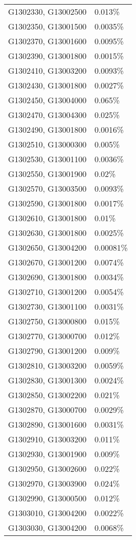 \begin{longtable}[]{@{}ll@{}}
G1302330, G13002500 & 0.013\% \\
G1302350, G13001500 & 0.0035\% \\
G1302370, G13001600 & 0.0095\% \\
G1302390, G13001800 & 0.0015\% \\
G1302410, G13003200 & 0.0093\% \\
G1302430, G13001800 & 0.0027\% \\
G1302450, G13004000 & 0.065\% \\
G1302470, G13004300 & 0.025\% \\
G1302490, G13001800 & 0.0016\% \\
G1302510, G13000300 & 0.005\% \\
G1302530, G13001100 & 0.0036\% \\
G1302550, G13001900 & 0.02\% \\
G1302570, G13003500 & 0.0093\% \\
G1302590, G13001800 & 0.0017\% \\
G1302610, G13001800 & 0.01\% \\
G1302630, G13001800 & 0.0025\% \\
G1302650, G13004200 & 0.00081\% \\
G1302670, G13001200 & 0.0074\% \\
G1302690, G13001800 & 0.0034\% \\
G1302710, G13001200 & 0.0054\% \\
G1302730, G13001100 & 0.0031\% \\
G1302750, G13000800 & 0.015\% \\
G1302770, G13000700 & 0.012\% \\
G1302790, G13001200 & 0.009\% \\
G1302810, G13003200 & 0.0059\% \\
G1302830, G13001300 & 0.0024\% \\
G1302850, G13002200 & 0.021\% \\
G1302870, G13000700 & 0.0029\% \\
G1302890, G13001600 & 0.0031\% \\
G1302910, G13003200 & 0.011\% \\
G1302930, G13001900 & 0.009\% \\
G1302950, G13002600 & 0.022\% \\
G1302970, G13003900 & 0.024\% \\
G1302990, G13000500 & 0.012\% \\
G1303010, G13004200 & 0.0022\% \\
G1303030, G13004200 & 0.0068\% \\

\end{longtable}
